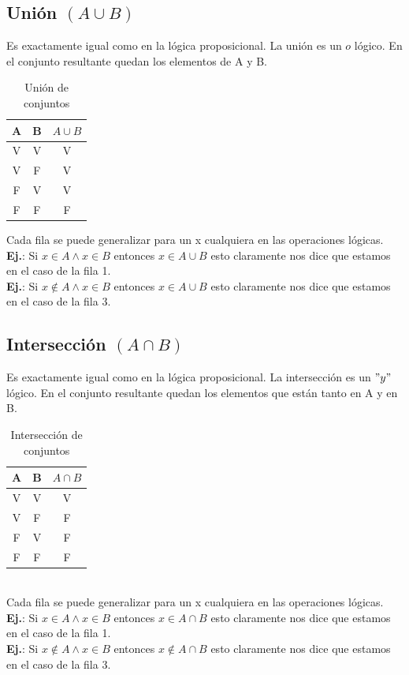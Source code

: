 \documentclass[10pt,a4paper]{article}
\begin{document}
\subsection*{Unión $(A \cup B)$}
Es exactamente igual como en la lógica proposicional. La unión es un $o$ lógico. En el conjunto resultante quedan los elementos de A y B. \\

\begin{table}[h!]
    \centering
    \begin{tabular}{|c | c | c|}
    \hline
    \textbf{A} & \textbf{B} & \textbf{$A \cup B$} \\[0.1cm]
    \hline
    V & V & V \\
    V & F & V \\
    F & V & V \\
    F & F & F \\
    \hline
    \end{tabular}
    \caption{Unión de conjuntos}
\end{table} 
Cada fila se puede generalizar para un x cualquiera en las operaciones lógicas. \\
\textbf{Ej.}: Si $x \in A \land x \in B$ entonces $ x \in A \cup B$ esto claramente nos dice que estamos en el caso de la fila 1. \\
\textbf{Ej.}: Si $x \notin A \land x \in B$ entonces $ x \in A \cup B$ esto claramente nos dice que estamos en el caso de la fila 3.
\subsection*{Intersección $(A \cap B)$}
Es exactamente igual como en la lógica proposicional. La intersección es un $"y"$ lógico. En el conjunto resultante quedan los elementos que están tanto en A y en B.
\begin{table}[h!]
    \centering
    \begin{tabular}{|c | c | c|}
    \hline
    \textbf{A} & \textbf{B} & \textbf{$A \cap B$} \\[0.1cm]
    \hline
    V & V & V \\
    V & F & F \\
    F & V & F \\
    F & F & F \\
    \hline
    \end{tabular}
    \caption{Intersección de conjuntos}
\end{table} \\
Cada fila se puede generalizar para un x cualquiera en las operaciones lógicas. \\
\textbf{Ej.}: Si $x \in A \land x \in B$ entonces $ x \in A \cap B$ esto claramente nos dice que estamos en el caso de la fila 1. \\
\textbf{Ej.}: Si $x \notin A \land x \in B$ entonces $ x \notin A \cap B$ esto claramente nos dice que estamos en el caso de la fila 3.
\end{document}
